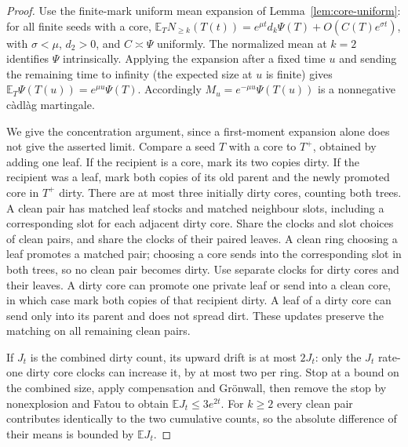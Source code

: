 \documentclass[11pt]{article}
\theoremstyle{remark}
\numberwithin{equation}{section}
\newcommand{\E}{\mathbb E}
\begin{document}
\begin{proof}
Use the finite-mark uniform mean expansion of Lemma~\ref{lem:core-uniform}: for all finite seeds with a core, $\mathbb E_T N_{\ge k}(T(t))=e^{\mu t}d_k\Psi(T)+O(C(T)e^{\sigma t})$, with $\sigma<\mu$, $d_2>0$, and $C\asymp\Psi$ uniformly. The normalized mean at $k=2$ identifies $\Psi$ intrinsically. Applying the expansion after a fixed time $u$ and sending the remaining time to infinity (the expected size at $u$ is finite) gives $\mathbb E_T\Psi(T(u))=e^{\mu u}\Psi(T)$. Accordingly $M_u=e^{-\mu u}\Psi(T(u))$ is a nonnegative c\`adl\`ag martingale.

We give the concentration argument, since a first-moment expansion alone does not give the asserted limit. Compare a seed $T$ with a core to $T^+$, obtained by adding one leaf. If the recipient is a core, mark its two copies dirty. If the recipient was a leaf, mark both copies of its old parent and the newly promoted core in $T^+$ dirty. There are at most three initially dirty cores, counting both trees. A clean pair has matched leaf stocks and matched neighbour slots, including a corresponding slot for each adjacent dirty core. Share the clocks and slot choices of clean pairs, and share the clocks of their paired leaves. A clean ring choosing a leaf promotes a matched pair; choosing a core sends into the corresponding slot in both trees, so no clean pair becomes dirty. Use separate clocks for dirty cores and their leaves. A dirty core can promote one private leaf or send into a clean core, in which case mark both copies of that recipient dirty. A leaf of a dirty core can send only into its parent and does not spread dirt. These updates preserve the matching on all remaining clean pairs.

If $J_t$ is the combined dirty count, its upward drift is at most $2J_t$: only the $J_t$ rate-one dirty core clocks can increase it, by at most two per ring. Stop at a bound on the combined size, apply compensation and Gr\"onwall, then remove the stop by nonexplosion and Fatou to obtain $\E J_t\le3e^{2t}$. For $k\ge2$ every clean pair contributes identically to the two cumulative counts, so the absolute difference of their means is bounded by $\E J_t$.


\end{proof}
\end{document}
